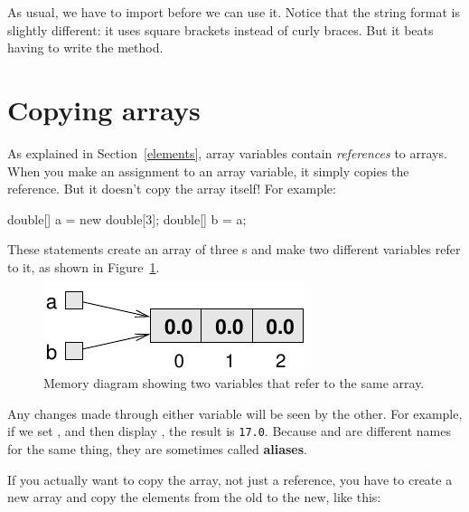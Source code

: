 \begin{stdout}
[1, 2, 3, 4]
\end{stdout}

As usual, we have to import  before we can use it.
Notice that the string format is slightly different: it uses square brackets instead of curly braces.
But it beats having to write the  method.


\section{Copying arrays}
\label{copyarray}


As explained in Section~\ref{elements}, array variables contain {\em references} to arrays.
When you make an assignment to an array variable, it simply copies the reference.
But it doesn't copy the array itself!
For example:

\begin{code}
double[] a = new double[3];
double[] b = a;
\end{code}

These statements create an array of three s and make two different variables refer to it, as shown in Figure~\ref{fig.array3}.

\begin{figure}[!ht]
\begin{center}
\includegraphics{figs/array3.pdf}
\caption{Memory diagram showing two variables that refer to the same array.}
\label{fig.array3}
\end{center}
\end{figure}


Any changes made through either variable will be seen by the other.
For example, if we set , and then display , the result is {\tt 17.0}.
Because  and  are different names for the same thing, they are sometimes called {\bf aliases}.

If you actually want to copy the array, not just a reference, you have to create a new array and copy the elements from the old to the new, like this:


